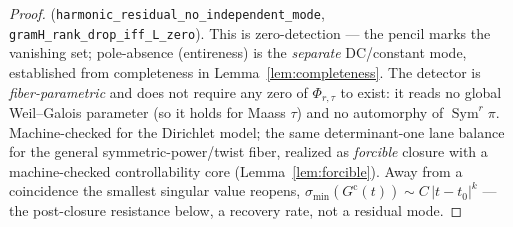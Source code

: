 \documentclass[11pt]{article}
\theoremstyle{definition}
\newcommand{\Sym}{\operatorname{Sym}}
\begin{document}
\begin{proof}
(\texttt{harmonic\_residual\_no\_independent\_mode}, \texttt{gramH\_rank\_drop\_iff\_L\_zero}). This is
zero-detection --- the pencil marks the vanishing set; pole-absence (entireness) is the \emph{separate}
DC/constant mode, established from completeness in Lemma~\ref{lem:completeness}.
The detector is \emph{fiber-parametric} and does not require any zero of $\Phi_{r,\tau}$ to exist: it reads
no global Weil--Galois parameter (so it holds for Maass $\tau$) and no automorphy of $\Sym^r\pi$. Machine-checked for the Dirichlet model;
the same determinant-one lane balance for the general symmetric-power/twist fiber, realized as
\emph{forcible} closure with a machine-checked controllability core (Lemma~\ref{lem:forcible}). Away from a coincidence the smallest singular value reopens,
$\sigma_{\min}(G^{\mathrm c}(t))\sim C\,|t-t_0|^{k}$ --- the post-closure resistance below, a recovery rate,
not a residual mode.
\end{proof}
\end{document}
